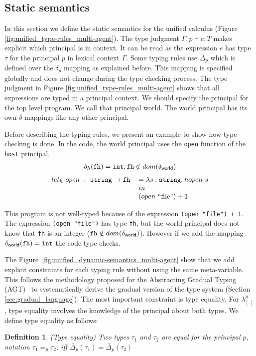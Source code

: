 \documentclass{article}
\newcommand{\tslam}[3]{\lambda #1 : #2. \: #3}
\newcommand{\quotes}[1]{``#1''}
\newcommand\icode[1]{\texttt{#1}}
\newcommand\newcalculus[0]{$\lambda^p_{\left[.\right]}$}
\newtheorem{defn}{Definition}[section]
\begin{document}
	
\subsection{Static semantics}
In this section we define the static semantics for the unified calculus (Figure \ref{fig:unified_type-rules_multi-agent}). The type judgment $\Gamma, p \vdash e : T$ makes explicit which principal is in context. It can be read as the expression $e$ has type $\tau$ for the principal $p$ in lexical context $\Gamma$.  Some typing rules use $\bar{\Delta}_p$ which is defined over the $\delta_p$ mapping as explained before. This mapping is specified globally and does not change during the type checking process. The type judgment in Figure \ref{fig:unified_type-rules_multi-agent} shows that all expressions are typed in a principal context. We should specify the principal for the top level program. We call that principal {\sf world}. The {\sf world} principal has its own $\delta$ mappings like any other principal.

Before describing the typing rules, we present an example to show how type-checking is done. In the code, the {\sf world} principal uses the \icode{open} function of the \icode{host} principal.
\[
\begin{tabular}{c}
$\delta_h(\icode{fh})=\icode{int}, \icode{fh} \notin dom(\delta_{{\sf world}})$ \\
\end{tabular}
\]
\[
\begin{tabular}{l l}
$let_h~open~:~\icode{string} \rightarrow \icode{fh}$ & $= \tslam{s}{\icode{string}}{hopen~s}$ \\
																									 & $in$ \\
																									 & $(open~$\quotes{file}$) + 1$
\end{tabular}
\]

This program is not well-typed because of the expression \icode{(open "file") + 1}. The expression \icode{(open "file")} has type \icode{fh}, but the {\sf world} principal does not know that \icode{fh} is an integer ($\icode{fh} \notin dom(\delta_{{\sf world}})$). However if we add the mapping $\delta_{{\sf world}}(\icode{fh})=\icode{int}$ the code type checks. 

The Figure~\ref{fig:unified_dynamic-semantics_multi-agent} show that we add explicit constraints for each typing rule without using the same meta-variable. This follows the methodology proposed for the Abstracting Gradual Typing (AGT)~\cite{garciaAl:popl2016} to systematically derive the gradual version of the type system (Section \ref{sec:gradual_language}). The most important constraint is type equality. For \newcalculus{}, type equality involves the knowledge of the principal about both types. We define type equality as follows:
\begin{defn}{(Type equality)}
Two types $\tau_1$ and $\tau_2$ are equal for the principal $p$, notation $\tau_1 =_p \tau_2$, iff $\bar{\Delta}_p(\tau_1) = \bar{\Delta}_p(\tau_2)$
\end{defn}
\end{document}
